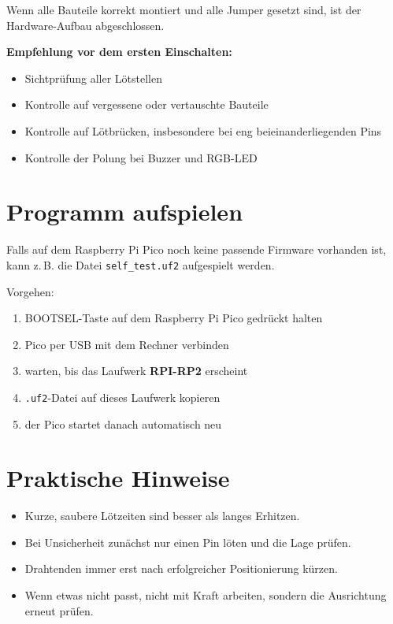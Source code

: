 \documentclass[a4paper,11pt]{article}
\begin{document}
Wenn alle Bauteile korrekt montiert und alle Jumper gesetzt sind, ist der Hardware-Aufbau abgeschlossen.

\textbf{Empfehlung vor dem ersten Einschalten:}
\begin{itemize}
    \item Sichtprüfung aller Lötstellen
    \item Kontrolle auf vergessene oder vertauschte Bauteile
    \item Kontrolle auf Lötbrücken, insbesondere bei eng beieinanderliegenden Pins
    \item Kontrolle der Polung bei Buzzer und RGB-LED
\end{itemize}

\section*{Programm aufspielen}

Falls auf dem Raspberry Pi Pico noch keine passende Firmware vorhanden ist, kann z.\,B. die Datei \texttt{self\_test.uf2} aufgespielt werden.

Vorgehen:
\begin{enumerate}
    \item BOOTSEL-Taste auf dem Raspberry Pi Pico gedrückt halten
    \item Pico per USB mit dem Rechner verbinden
    \item warten, bis das Laufwerk \textbf{RPI-RP2} erscheint
    \item \texttt{.uf2}-Datei auf dieses Laufwerk kopieren
    \item der Pico startet danach automatisch neu
\end{enumerate}

\section*{Praktische Hinweise}

\begin{itemize}
    \item Kurze, saubere Lötzeiten sind besser als langes Erhitzen.
    \item Bei Unsicherheit zunächst nur einen Pin löten und die Lage prüfen.
    \item Drahtenden immer erst nach erfolgreicher Positionierung kürzen.
    \item Wenn etwas nicht passt, nicht mit Kraft arbeiten, sondern die Ausrichtung erneut prüfen.
\end{itemize}
\end{document}
